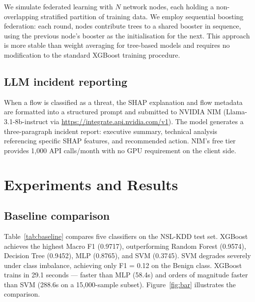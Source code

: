 \documentclass[review]{elsarticle}  %
\begin{document}
We simulate federated learning with $N$ network nodes, each
holding a non-overlapping stratified partition of training data.
We employ sequential boosting federation: each round, nodes
contribute trees to a shared booster in sequence, using the
previous node's booster as the initialisation for the next.
This approach is more stable than weight averaging for
tree-based models and requires no modification to the
standard XGBoost training procedure.

\subsection{LLM incident reporting}

When a flow is classified as a threat, the SHAP explanation
and flow metadata are formatted into a structured prompt and
submitted to NVIDIA NIM (Llama-3.1-8b-instruct via
\url{https://integrate.api.nvidia.com/v1}). The model generates
a three-paragraph incident report: executive summary, technical
analysis referencing specific SHAP features, and recommended
action. NIM's free tier provides 1,000 API calls/month with
no GPU requirement on the client side.

\section{Experiments and Results}
\label{sec:experiments}

\subsection{Baseline comparison}

Table~\ref{tab:baseline} compares five classifiers on the
NSL-KDD test set. XGBoost achieves the highest Macro F1 (0.9717),
outperforming Random Forest (0.9574), Decision Tree (0.9452),
MLP (0.8765), and SVM (0.3745). SVM degrades severely under
class imbalance, achieving only F1 = 0.12 on the Benign class.
XGBoost trains in 29.1 seconds — faster than MLP (58.4s) and
orders of magnitude faster than SVM (288.6s on a 15,000-sample
subset). Figure~\ref{fig:bar} illustrates the comparison.
\end{document}
